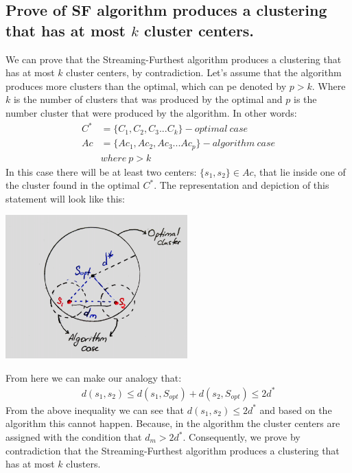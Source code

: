 \documentclass[11pt,a4paper,english]{article}
\begin{document}
      \subsection{Prove of SF algorithm produces a clustering that has at most $k$ cluster centers.}
        We can prove that the Streaming-Furthest algorithm produces a clustering that has at most $k$ cluster centers, by contradiction. Let's assume that the algorithm produces more clusters than the optimal, which can pe denoted by $p > k$. Where $k$ is the number of clusters that was produced by the optimal and $p$ is the number cluster that were produced by the algorithm. In other words:
        \begin{align*}
          C^* & = \{C_1, C_2, C_3 ... C_k\} - optimal\ case \\
          Ac & = \{Ac_1, Ac_2, Ac_3 ... Ac_p\} - algorithm\ case \\
          & where \ p > k
        \end{align*}
        In this case there will be at least two centers: $\{s_1, s_2\} \in Ac $, that lie inside one of the cluster found in the optimal $C^*$.
        The representation and depiction of this statement will look like this:
        \begin{center}
          \includegraphics[width=7cm]{sc_8.png}
        \end{center}
        From here we can make our analogy that:
        \begin{align*}
          d(s_1, s_2) \leq d(s_1, S_{opt}) + d(s_2, S_{opt}) \leq 2d^*
        \end{align*}
        From the above inequality we can see that $d(s_1, s_2) \leq 2d^*$ and based on the algorithm this cannot happen. Because, in the algorithm the cluster centers are assigned with the condition that $d_m > 2d^*$. Consequently, we prove by contradiction that the Streaming-Furthest algorithm produces a clustering that has at most $k$ clusters.
\end{document}

